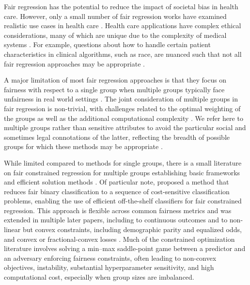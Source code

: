 \documentclass[
  12pt]{article}
\begin{document}
Fair regression has the potential to reduce the impact of societal bias
in health care. However, only a small number of fair regression works
have examined realistic use cases in health care
\citep{zink_fair_2020, mcguire_improving_2021, pfohl_empirical_2021, pfohl_net_2022, wang_enhancing_2025}.
Health care applications have complex ethical considerations, many of
which are unique due to the complexity of medical systems
\citep{chen_ethical_2021, chen_algorithmic_2023, feng_fair_2025}. For
example, questions about how to handle certain patient characteristics
in clinical algorithms, such as race, are nuanced such that not all fair
regression approaches may be appropriate
\citep{cusick_algorithmic_2024, zink_race_2024}.

A major limitation of most fair regression approaches is that they focus
on fairness with respect to a single group when multiple groups
typically face unfairness in real world settings
\citep{yang_fairness_2020, chen_ethical_2021, liu_practical_2022, wang_enhancing_2025}.
The joint consideration of multiple groups in fair regression is
non-trivial, with challenges related to the optimal weighting of the
groups as well as the additional computational complexity
\citep{kearns_preventing_2018, narasimhan_approximate_2020, diana_minimax_2021}.
We refer here to multiple groups rather than sensitive attributes to
avoid the particular social and sometimes legal connotations of the
latter, reflecting the breadth of possible groups for which these
methods may be appropriate \citep{deho_should_2023}.

While limited compared to methods for single groups, there is a small
literature on fair constrained regression for multiple groups
establishing basic frameworks and efficient solution methods
\citep{kearns_preventing_2018, narasimhan_learning_2018, agarwal_fair_2019, zafar_fairness_2019, narasimhan_approximate_2020, yang_fairness_2020, diana_minimax_2021, hu_sequentially_2024, wang_enhancing_2025}.
Of particular note, \citet{agarwal_reductions_2018} proposed a method
that reduces fair binary classification to a sequence of cost-sensitive
classification problems, enabling the use of efficient off-the-shelf
classifiers for fair constrained regression. This approach is flexible
across common fairness metrics and was extended in multiple later
papers, including to continuous outcomes \citep{agarwal_fair_2019} and
to non-linear but convex constraints, including demographic parity and
equalized odds, and convex or fractional-convex losses
\citep{narasimhan_learning_2018}. Much of the constrained optimization
literature involves solving a min--max saddle-point game between a
predictor and an adversary enforcing fairness constraints, often leading
to non-convex objectives, instability, substantial hyperparameter
sensitivity, and high computational cost, especially when group sizes
are imbalanced.
\end{document}

